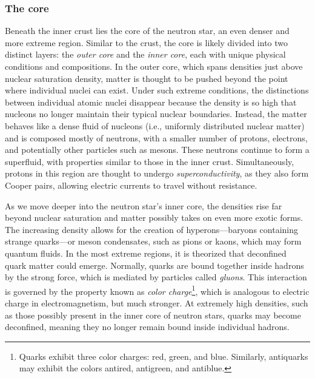 \documentclass[main.tex]{subfiles}
\begin{document}
    \subsubsection{The core}
    Beneath the inner crust lies the core of the neutron star, an even denser and more extreme region. Similar to the crust, the core is likely divided into two distinct layers: the \textit{outer core} and the \textit{inner core}, each with unique physical conditions and compositions. 
    In the outer core, which spans densities just above nuclear saturation density, matter is thought to be pushed beyond the point where individual nuclei can exist. Under such extreme conditions, the distinctions between individual atomic nuclei disappear because the density is so high that nucleons no longer maintain their typical nuclear boundaries. Instead, the matter behaves like a dense fluid of nucleons (i.e., uniformly distributed nuclear matter) and is composed mostly of neutrons, with a smaller number of protons, electrons, and potentially other particles such as mesons. These neutrons continue to form a superfluid, with properties similar to those in the inner crust. Simultaneously, protons in this region are thought to undergo \textit{superconductivity}, as they also form Cooper pairs, allowing electric currents to travel without resistance.

    As we move deeper into the neutron star's inner core, the densities rise far beyond nuclear saturation and matter possibly takes on even more exotic forms. The increasing density allows for the creation of hyperons---baryons containing strange quarks---or meson condensates, such as pions or kaons, which may form quantum fluids. In the most extreme regions, it is theorized that deconfined quark matter could emerge. Normally, quarks are bound together inside hadrons by the strong force, which is mediated by particles called \textit{gluons}. This interaction is governed by the property known as \textit{color charge}\footnote{Quarks exhibit three color charges: red, green, and blue. Similarly, antiquarks may exhibit the colors antired, antigreen, and antiblue.}, which is analogous to electric charge in electromagnetism, but much stronger. At extremely high densities, such as those possibly present in the inner core of neutron stars, quarks may become deconfined, meaning they no longer remain bound inside individual hadrons.
\end{document}

